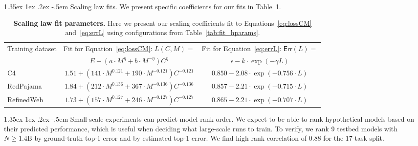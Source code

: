 \documentclass[dvipsnames,11pt]{article}
\makeatletter
\renewcommand\paragraph{\@startsection{paragraph}{4}{\z@}                                     {1.35ex \@plus1ex \@minus.2ex}                                {-.5em}
{\normalfont\normalsize\bfseries}}
\makeatother
\begin{document}
\begin{appendix}
\paragraph{Scaling law fits.}
We present specific coefficients for our fits in Table~\ref{tab:fits}.

\begin{table}[tp]
    \centering
    \small
    \caption{\textbf{Scaling law fit parameters.}
    Here we present our scaling coefficients fit to Equations~\eqref{eq:lossCM} and~\eqref{eq:errL} using configurations from Table~\ref{tab:fit_hparams}.}    
    \begin{tabular}{lcc}
        \toprule
        Training dataset &  Fit for Equation~\eqref{eq:lossCM}: $L(C,M) = $ & Fit for Equation~\eqref{eq:errL}: $\textsf{Err}(L) =$ \\
        & $E + (a \cdot M^{\eta} + b \cdot M^{-\eta}) C^{\eta}$ & $\epsilon - k \cdot \exp{(-\gamma L)}$\\\midrule
        C4~\cite{c4,c4_ai2} & $1.51 + \left(141 \cdot M^{0.121} + 190 \cdot M^{-0.121} \right) C^{-0.121}$ & $0.850 - 2.08 \cdot \exp{(-0.756 \cdot L)}$ \\
        RedPajama~\cite{rpj} & $1.84 + \left(212 \cdot M^{0.136} + 367 \cdot M^{-0.136} \right) C^{-0.136}$ & $0.857 - 2.21 \cdot \exp{(-0.715 \cdot L)}$ \\
        RefinedWeb~\cite{refinedweb} & $1.73 + \left(157 \cdot M^{0.127} + 246 \cdot M^{-0.127} \right) C^{-0.127}$ & $0.865 - 2.21 \cdot \exp{(-0.707 \cdot L)}$ \\\bottomrule
    \end{tabular}
    \label{tab:fits}
\end{table}

\paragraph{Small-scale experiments can predict model rank order.}
We expect to be able to rank hypothetical models based on their predicted performance, which is useful when deciding what large-scale runs to train.
To verify, we rank 9 testbed models with $N\geq1.4\text{B}$ by ground-truth top-1 error and by estimated top-1 error.
We find high rank correlation of 0.88 for the 17-task split.


\end{appendix}
\end{document}
